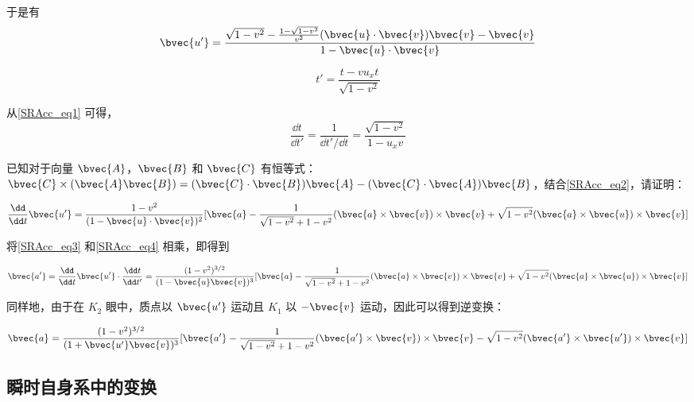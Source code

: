 于是有
\begin{equation}\label{SRAcc_eq2}
\bvec{u'}=\frac{\sqrt{1-v^2}-\frac{1-\sqrt{1-v^2}}{v^2}(\bvec{u}\cdot\bvec{v})\bvec{v}-\bvec{v}}{1-\bvec{u}\cdot\bvec{v}}
\end{equation}

\begin{equation}\label{SRAcc_eq1}
t'=\frac{t-vu_xt}{\sqrt{1-v^2}}
\end{equation}

从\autoref{SRAcc_eq1} 可得，
\begin{equation}\label{SRAcc_eq3}
\frac{\dd t}{\dd t'}=\frac{1}{\dd t'/\dd t}=\frac{\sqrt{1-v^2}}{1-u_xv}
\end{equation}

\begin{exercise}{}

已知对于向量 $\bvec{A}$，$\bvec{B}$ 和 $\bvec{C}$ 有恒等式：$\bvec{C}\times(\bvec{A}\bvec{B})=(\bvec{C}\cdot\bvec{B})\bvec{A}-(\bvec{C}\cdot\bvec{A})\bvec{B}$，结合\autoref{SRAcc_eq2}，请证明：

\begin{equation}\label{SRAcc_eq4}
\frac{\dd}{\dd t}\bvec{u'}=\frac{1-v^2}{(1-\bvec{u}\cdot\bvec{v})^2}[\bvec{a}-\frac{1}{\sqrt{1-v^2}+1-v^2}(\bvec{a}\times\bvec{v})\times\bvec{v}+\sqrt{1-v^2}(\bvec{a}\times\bvec{u})\times\bvec{v}]
\end{equation}

\end{exercise}

将\autoref{SRAcc_eq3} 和\autoref{SRAcc_eq4} 相乘，即得到

\begin{equation}
\bvec{a'}=\frac{\dd}{\dd t}\bvec{u'}\cdot\frac{\dd t}{\dd t'}=\frac{(1-v^2)^{3/2}}{(1-\bvec{u}\bvec{v})^3}[\bvec{a}-\frac{1}{\sqrt{1-v^2}+1-v^2}(\bvec{a}\times\bvec{v})\times\bvec{v}+\sqrt{1-v^2}(\bvec{a}\times\bvec{u})\times\bvec{v}]
\end{equation}

同样地，由于在 $K_2$ 眼中，质点以 $\bvec{u'}$ 运动且 $K_1$ 以 $-\bvec{v}$ 运动，因此可以得到逆变换：

\begin{equation}\label{SRAcc_eq5}
\bvec{a}=\frac{(1-v^2)^{3/2}}{(1+\bvec{u'}\bvec{v})^3}[\bvec{a'}-\frac{1}{\sqrt{1-v^2}+1-v^2}(\bvec{a'}\times\bvec{v})\times\bvec{v}-\sqrt{1-v^2}(\bvec{a'}\times\bvec{u'})\times\bvec{v}]
\end{equation}


\subsection{瞬时自身系中的变换}

